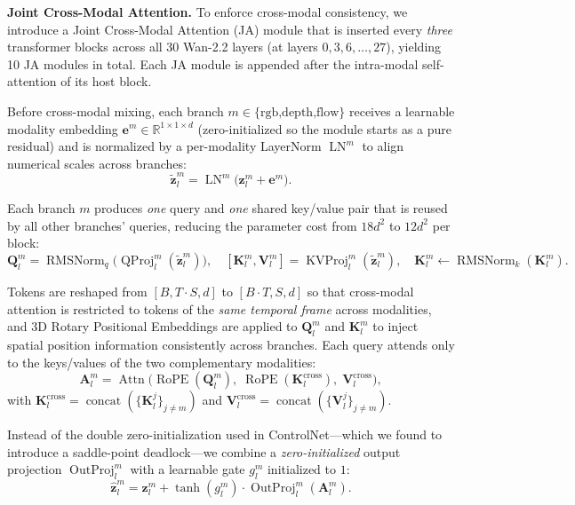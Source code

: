 \noindent
\textbf{Joint Cross-Modal Attention.}
To enforce cross-modal consistency, we introduce a Joint Cross-Modal Attention (JA) module that is inserted every \emph{three} transformer blocks across all 30 Wan-2.2 layers (at layers $0, 3, 6, \dots, 27$), yielding 10 JA modules in total. Each JA module is appended after the intra-modal self-attention of its host block.

Before cross-modal mixing, each branch $m \in \{\text{rgb,depth,flow}\}$ receives a learnable modality embedding $\bm{e}^m \in \mathbb{R}^{1\times 1\times d}$ (zero-initialized so the module starts as a pure residual) and is normalized by a per-modality LayerNorm $\operatorname{LN}^{m}$ to align numerical scales across branches:
\begin{equation}
\tilde{\bm{z}}_l^m = \operatorname{LN}^{m}\bigl(\bm{z}_l^m + \bm{e}^m\bigr).
\end{equation}

Each branch $m$ produces \emph{one} query and \emph{one} shared key/value pair that is reused by all other branches' queries, reducing the parameter cost from $18d^2$ to $12d^2$ per block:
\begin{equation}
\bm{Q}_l^m = \operatorname{RMSNorm}_q\!\bigl(\operatorname{QProj}_l^m(\tilde{\bm{z}}_l^m)\bigr),\quad
[\bm{K}_l^m, \bm{V}_l^m] = \operatorname{KVProj}_l^m(\tilde{\bm{z}}_l^m),\quad
\bm{K}_l^m \!\leftarrow\! \operatorname{RMSNorm}_k(\bm{K}_l^m).
\end{equation}

Tokens are reshaped from $[B, T{\cdot}S, d]$ to $[B{\cdot}T, S, d]$ so that cross-modal attention is restricted to tokens of the \emph{same temporal frame} across modalities, and 3D Rotary Positional Embeddings are applied to $\bm{Q}_l^m$ and $\bm{K}_l^m$ to inject spatial position information consistently across branches. Each query attends only to the keys/values of the two complementary modalities:
\begin{equation}               
\bm{A}_l^m = \operatorname{Attn}\bigl(\operatorname{RoPE}(\bm{Q}_l^m),\;\operatorname{RoPE}(\bm{K}_l^{\text{cross}}),\;\bm{V}_l^{\text{cross}}\bigr),             \end{equation}
with $\bm{K}_l^{\text{cross}} = \operatorname{concat}(\{\bm{K}_l^j\}_{j\neq m})$ and $\bm{V}_l^{\text{cross}} = \operatorname{concat}(\{\bm{V}_l^j\}_{j\neq m})$.

Instead of the double zero-initialization used in ControlNet—which we found to introduce a saddle-point deadlock—we combine a \emph{zero-initialized} output projection $\operatorname{OutProj}_l^m$ with a learnable gate $g_l^m$ initialized to $1$:    
\begin{equation}
\hat{\bm{z}}_l^m = \bm{z}_l^m + \tanh(g_l^m)\cdot \operatorname{OutProj}_l^m(\bm{A}_l^m).                                \end{equation}                                                         

